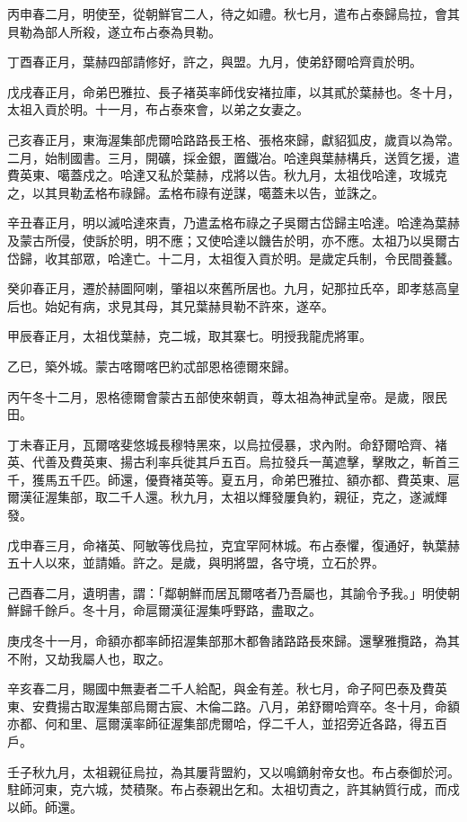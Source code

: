 \begin{pinyinscope}
丙申春二月，明使至，從朝鮮官二人，待之如禮。秋七月，遣布占泰歸烏拉，會其貝勒為部人所殺，遂立布占泰為貝勒。

丁酉春正月，葉赫四部請修好，許之，與盟。九月，使弟舒爾哈齊貢於明。

戊戌春正月，命弟巴雅拉、長子褚英率師伐安褚拉庫，以其貳於葉赫也。冬十月，太祖入貢於明。十一月，布占泰來會，以弟之女妻之。

己亥春正月，東海渥集部虎爾哈路路長王格、張格來歸，獻貂狐皮，歲貢以為常。二月，始制國書。三月，開礦，採金銀，置鐵冶。哈達與葉赫構兵，送質乞援，遣費英東、噶蓋戍之。哈達又私於葉赫，戍將以告。秋九月，太祖伐哈達，攻城克之，以其貝勒孟格布祿歸。孟格布祿有逆謀，噶蓋未以告，並誅之。

辛丑春正月，明以滅哈達來責，乃遣孟格布祿之子吳爾古岱歸主哈達。哈達為葉赫及蒙古所侵，使訴於明，明不應；又使哈達以饑告於明，亦不應。太祖乃以吳爾古岱歸，收其部眾，哈達亡。十二月，太祖復入貢於明。是歲定兵制，令民間養蠶。

癸卯春正月，遷於赫圖阿喇，肇祖以來舊所居也。九月，妃那拉氏卒，即孝慈高皇后也。始妃有病，求見其母，其兄葉赫貝勒不許來，遂卒。

甲辰春正月，太祖伐葉赫，克二城，取其寨七。明授我龍虎將軍。

乙巳，築外城。蒙古喀爾喀巴約忒部恩格德爾來歸。

丙午冬十二月，恩格德爾會蒙古五部使來朝貢，尊太祖為神武皇帝。是歲，限民田。

丁未春正月，瓦爾喀斐悠城長穆特黑來，以烏拉侵暴，求內附。命舒爾哈齊、褚英、代善及費英東、揚古利率兵徙其戶五百。烏拉發兵一萬遮擊，擊敗之，斬首三千，獲馬五千匹。師還，優賚褚英等。夏五月，命弟巴雅拉、額亦都、費英東、扈爾漢征渥集部，取二千人還。秋九月，太祖以輝發屢負約，親征，克之，遂滅輝發。

戊申春三月，命褚英、阿敏等伐烏拉，克宜罕阿林城。布占泰懼，復通好，執葉赫五十人以來，並請婚。許之。是歲，與明將盟，各守境，立石於界。

己酉春二月，遺明書，謂：「鄰朝鮮而居瓦爾喀者乃吾屬也，其諭令予我。」明使朝鮮歸千餘戶。冬十月，命扈爾漢征渥集呼野路，盡取之。

庚戌冬十一月，命額亦都率師招渥集部那木都魯諸路路長來歸。還擊雅攬路，為其不附，又劫我屬人也，取之。

辛亥春二月，賜國中無妻者二千人給配，與金有差。秋七月，命子阿巴泰及費英東、安費揚古取渥集部烏爾古宸、木倫二路。八月，弟舒爾哈齊卒。冬十月，命額亦都、何和里、扈爾漢率師征渥集部虎爾哈，俘二千人，並招旁近各路，得五百戶。

壬子秋九月，太祖親征烏拉，為其屢背盟約，又以鳴鏑射帝女也。布占泰御於河。駐師河東，克六城，焚積聚。布占泰親出乞和。太祖切責之，許其納質行成，而戍以師。師還。


\end{pinyinscope}

